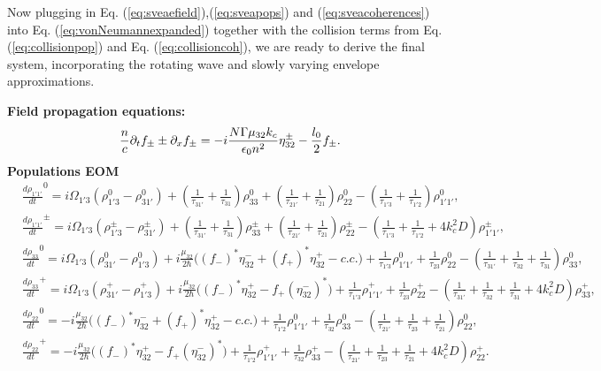 \documentclass[10pt,letterpaper]{article}
\begin{document}
Now plugging in Eq. (\ref{eq:sveaefield}),(\ref{eq:sveapops}) and (\ref{eq:sveacoherences}) into Eq. (\ref{eq:vonNeumannexpanded}) together with the collision terms from Eq. (\ref{eq:collisionpop}) and Eq. (\ref{eq:collisioncoh}), we are ready to derive the final system, incorporating the rotating wave and slowly varying envelope approximations.

\noindent
\textbf{Field propagation equations:}
\begin{equation}
\frac{n}{c}\partial_t f_{\pm} \pm \partial_{x}f_{\pm} = -i\frac{N \Gamma \mu_{32} k_c}{\epsilon_0 n^2} \eta_{32}^{\pm} - \frac{l_0}{2} f_{\pm} \label{eq:rtwaveq} .\\
\end{equation}
\textbf{Populations EOM}
\begin{align}
&\frac{d \rho_{1'1'}}{d t}^{0} = i\Omega_{1'3} (\rho_{1'3}^{0} - \rho_{31'}^{0}) + (\frac{1}{\tau_{31'}} + \frac{1}{\tau_{31}})\rho_{33}^{0} 
 + (\frac{1}{\tau_{21'}} + \frac{1}{\tau_{21}})\rho_{22}^{0} - (\frac{1}{\tau_{1'3}}  + \frac{1}{\tau_{1'2}} )\rho_{1'1'}^{0} ,\nonumber\\
&\frac{d \rho_{1'1'}}{d t}^{\pm} = i\Omega_{1'3} (\rho_{1'3}^{\pm} - \rho_{31'}^{\pm}) + (\frac{1}{\tau_{31'}} + \frac{1}{\tau_{31}})\rho_{33}^{\pm}  
+ (\frac{1}{\tau_{21'}} + \frac{1}{\tau_{21}})\rho_{22}^{\pm} - (\frac{1}{\tau_{1'3}} + \frac{1}{\tau_{1'2}} +4k_c^2D )\rho_{1'1'}^{\pm} ,\nonumber\\
&\frac{d \rho_{33}}{d t}^0 = i\Omega_{1'3} (\rho_{31'}^0 - \rho_{1'3}^0) + i\frac{\mu_{32}}{2\hbar} \big ((f_{-})^*\eta_{32}^{-}+(f_{+})^*\eta_{32}^{+} - c.c. \big )+ \frac{1}{\tau_{1'3}} 
\rho_{1'1'}^0 +  \frac{1}{\tau_{23}}\rho_{22}^0 - (\frac{1}{\tau_{31'}} + \frac{1}{\tau_{32}} + \frac{1}{\tau_{31}}) \rho_{33}^0 ,\nonumber\\
&\frac{d \rho_{33}}{d t}^{+}   = i\Omega_{1'3} (\rho_{31'}^{+} - \rho_{1'3}^{+}) + i\frac{\mu_{32}}{2\hbar}\big ( (f_{-})^*\eta_{32}^{+}-f_{+}(\eta_{32}^{-})^* \big ) 
+ \frac{1}{\tau_{1'3}}\rho_{1'1'}^+ +  \frac{1}{\tau_{23}}\rho_{22}^+ - (\frac{1}{\tau_{31'}} + \frac{1}{\tau_{32}} + \frac{1}{\tau_{31}} +4k_c^2D) \rho_{33}^+ ,\nonumber\\
&\frac{d \rho_{22}}{d t}^{0}  = -i\frac{\mu_{32}}{2\hbar} \big ((f_{-})^*\eta_{32}^{-}+(f_{+})^*\eta_{32}^{+} - c.c. \big ) + \frac{1}{\tau_{1'2}}\rho_{1'1'}^0  +  \frac{1}{\tau_{32}}\rho_{33}^{0} - (\frac{1}{\tau_{21'}} + \frac{1}{\tau_{23}} + \frac{1}{\tau_{21}}) \rho_{22}^0,\nonumber \\
&\frac{d \rho_{22}}{d t}^{+}   = - i\frac{\mu_{32}}{2\hbar}\big ( (f_{-})^*\eta_{32}^{+}-f_{+}(\eta_{32}^{-})^* \big )  + \frac{1}{\tau_{1'2}}\rho_{1'1'}^+  +  \frac{1}{\tau_{32}}\rho_{33}^+ - (\frac{1}{\tau_{21'}} + \frac{1}{\tau_{23}} + \frac{1}{\tau_{21}} +4k_c^2D) \rho_{22}^+ .
\end{align}
\end{document}
